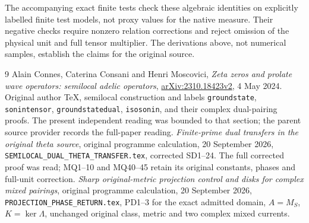 \documentclass[11pt]{article}
\begin{document}
The accompanying exact finite tests check these algebraic identities
on explicitly labelled finite test models, not proxy values for the
native measure. Their negative checks require nonzero relation
corrections and reject omission of the physical unit and full
tensor multiplier. The derivations above, not numerical samples,
establish the claims for the original source.

\begin{thebibliography}{9}
 Alain Connes, Caterina Consani and Henri Moscovici,
\emph{Zeta zeros and prolate wave operators: semilocal adelic operators},
\href{https://arxiv.org/abs/2310.18423v2}{arXiv:2310.18423v2},
4 May 2024. Original author TeX, semilocal construction and labels
\texttt{groundstate}, \texttt{sonintensor}, \texttt{groundstatedual},
\texttt{isosonin}, and their complex dual-pairing proofs. The present
independent reading was bounded to that section; the parent source
provider records the full-paper reading.
 \emph{Finite-prime dual transfers in the original theta
source}, original programme calculation, 20 September 2026,
\texttt{SEMILOCAL\_DUAL\_THETA\_TRANSFER.tex}, corrected SD1--24.
The full corrected proof was read; MQ1--10 and MQ40--45 retain its
original constants, phases and full-unit correction.
 \emph{Sharp original-metric projection control and disks
for complex mixed pairings}, original programme calculation,
20 September 2026, \texttt{PROJECTION\_PHASE\_RETURN.tex},
PD1--3 for the exact admitted domain, $A=M_S$, $K=\ker\Lambda$,
unchanged original class, metric and two complex mixed currents.
\end{thebibliography}
\end{document}
